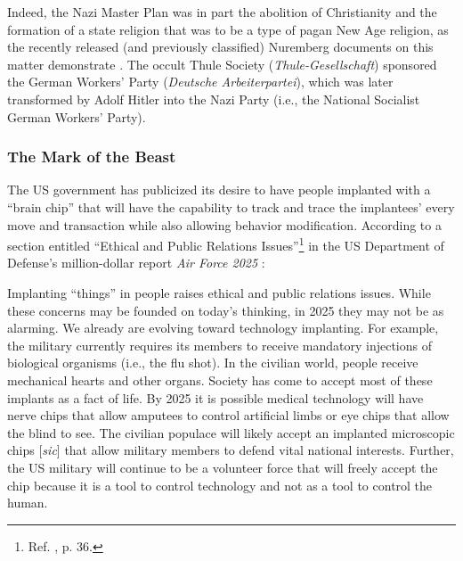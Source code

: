 \documentclass[letterpaper,12pt]{article}
\newenvironment{squote}
  {\small\quote}
  {\endquote\normalsize}
\begin{document}
Indeed, the Nazi Master Plan was in part the abolition of Christianity and the formation of a state religion that was to be a type of pagan New Age religion, as the recently released (and previously classified) Nuremberg documents on this matter demonstrate \cite{Colimore2002,CULLDonovan,Lauricella2004,Martin1949,OSS1945,SiemonNetto2002}. The occult Thule Society (\emph{Thule-Gesellschaft}) sponsored the German Workers' Party (\emph{Deutsche Arbeiterpartei}), which was later transformed by Adolf Hitler into the Nazi Party (i.e., the National Socialist German Workers' Party).

\subsubsection{The Mark of the Beast}
\label{subsubsec:MarkOfTheBeast}

The US government has publicized its desire to have people implanted with a ``brain chip'' that will have the capability to track and trace the implantees' every move and transaction while also allowing behavior modification. According to a section entitled ``Ethical and Public Relations Issues''\footnote{Ref. , p. 36.} in the US Department of Defense's million-dollar report \emph{Air Force 2025} \cite{Najman1998,Nelson1996,NYT1997-12-28}:

\begin{squote}
Implanting ``things'' in people raises ethical and public relations issues. While these concerns may be founded on today's thinking, in 2025 they may not be as alarming. We already are evolving toward technology implanting. For example, the military currently requires its members to receive mandatory injections of biological organisms (i.e., the flu shot). In the civilian world, people receive mechanical hearts and other organs. Society has come to accept most of these implants as a fact of life. By 2025 it is possible medical technology will have nerve chips that allow amputees to control artificial limbs or eye chips that allow the blind to see. The civilian populace will likely accept an implanted microscopic chips [\emph{sic}] that allow military members to defend vital national interests. Further, the US military will continue to be a volunteer force that will freely accept the chip because it is a tool to control technology and not as a tool to control the human.
\end{squote}
\end{document}
